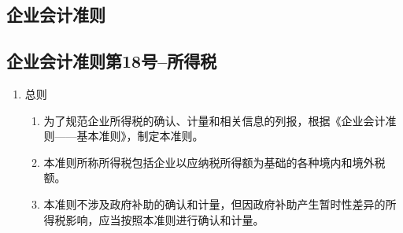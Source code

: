 


\begin{appendices}
    \renewcommand{\appendixname}{附录}

    \chapter{企业会计准则}
    \section{企业会计准则第18号--所得税}\label{app:zz18}
    \begin{enumerate}[itemsep=0pt, leftmargin=1cm, before=\normalfont\small] %
        \item 总则 %
              \begin{enumerate}[itemsep=0pt, leftmargin=1cm, before=\normalfont\small] %
                  \item 为了规范企业所得税的确认、计量和相关信息的列报，根据《企业会计准则——基本准则》，制定本准则。
                  \item 本准则所称所得税包括企业以应纳税所得额为基础的各种境内和境外税额。
                  \item 本准则不涉及政府补助的确认和计量，但因政府补助产生暂时性差异的所得税影响，应当按照本准则进行确认和计量。


\end{enumerate}
\end{enumerate}
\end{appendices}
